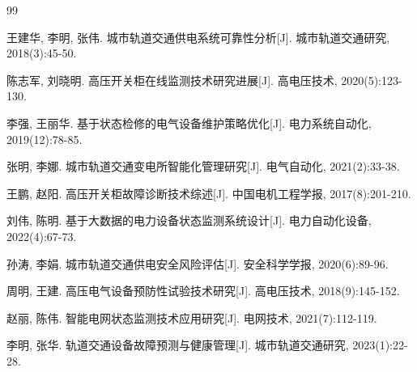 \begin{thebibliography}{99}

 王建华, 李明, 张伟. 城市轨道交通供电系统可靠性分析[J]. 城市轨道交通研究, 2018(3):45-50.

 陈志军, 刘晓明. 高压开关柜在线监测技术研究进展[J]. 高电压技术, 2020(5):123-130.

 李强, 王丽华. 基于状态检修的电气设备维护策略优化[J]. 电力系统自动化, 2019(12):78-85.

 张明, 李娜. 城市轨道交通变电所智能化管理研究[J]. 电气自动化, 2021(2):33-38.

 王鹏, 赵阳. 高压开关柜故障诊断技术综述[J]. 中国电机工程学报, 2017(8):201-210.

 刘伟, 陈明. 基于大数据的电力设备状态监测系统设计[J]. 电力自动化设备, 2022(4):67-73.

 孙涛, 李娟. 城市轨道交通供电安全风险评估[J]. 安全科学学报, 2020(6):89-96.

 周明, 王建. 高压电气设备预防性试验技术研究[J]. 高电压技术, 2018(9):145-152.

 赵丽, 陈伟. 智能电网状态监测技术应用研究[J]. 电网技术, 2021(7):112-119.

 李明, 张华. 轨道交通设备故障预测与健康管理[J]. 城市轨道交通研究, 2023(1):22-28.

\end{thebibliography}